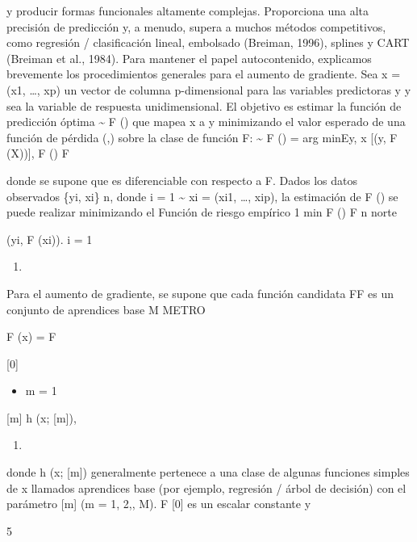 \documentclass[]{article}
\providecommand{\tightlist}{%
  \setlength{\itemsep}{0pt}\setlength{\parskip}{0pt}}
\begin{document}
y producir formas funcionales altamente complejas. Proporciona una alta
precisión de predicción y, a menudo, supera a muchos métodos
competitivos, como regresión / clasificación lineal, embolsado (Breiman,
1996), splines y CART (Breiman et al., 1984). Para mantener el papel
autocontenido, explicamos brevemente los procedimientos generales para
el aumento de gradiente. Sea x = (x1, \ldots{}, xp) un vector de columna
p-dimensional para las variables predictoras y y sea la variable de
respuesta unidimensional. El objetivo es estimar la función de
predicción óptima \textasciitilde{} F () que mapea x a y minimizando el
valor esperado de una función de pérdida (,) sobre la clase de función
F: \textasciitilde{} F () = arg minEy, x {[}(y, F (X)){]}, F () F

donde se supone que es diferenciable con respecto a F. Dados los datos
observados \{yi, xi\} n, donde i = 1 \textasciitilde{} xi = (xi1,
\ldots{}, xip), la estimación de F () se puede realizar minimizando el
Función de riesgo empírico 1 min F () F n norte

(yi, F (xi)). i = 1

\begin{enumerate}
\def\labelenumi{(\arabic{enumi})}
\item
\end{enumerate}

Para el aumento de gradiente, se supone que cada función candidata FF es
un conjunto de aprendices base M METRO

F (x) = F

{[}0{]}

\begin{itemize}
\tightlist
\item
  m = 1
\end{itemize}

{[}m{]} h (x; {[}m{]}),

\begin{enumerate}
\def\labelenumi{(\arabic{enumi})}
\setcounter{enumi}{1}
\item
\end{enumerate}

donde h (x; {[}m{]}) generalmente pertenece a una clase de algunas
funciones simples de x llamados aprendices base (por ejemplo, regresión
/ árbol de decisión) con el parámetro {[}m{]} (m = 1, 2,, M). F {[}0{]}
es un escalar constante y

5
\end{document}
